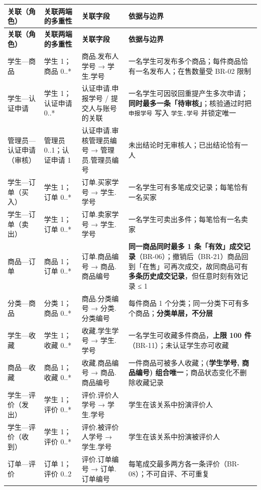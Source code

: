 \documentclass[12pt,a4paper]{ctexart}
\begin{document}
{\scriptsize
\begin{longtable}{|p{2.09cm}|p{2.15cm}|p{3.28cm}|p{8.48cm}|}
\hline
\textbf{关联（角色）} & \textbf{关联两端的多重性} & \textbf{关联字段} & \textbf{依据与边界} \\
\hline
\endfirsthead
\hline
\textbf{关联（角色）} & \textbf{关联两端的多重性} & \textbf{关联字段} & \textbf{依据与边界} \\
\hline
\endhead
\hline
\endfoot
学生—商品 & 学生 1；商品 0..* & 商品.发布人学号 → 学生.学号 & 一名学生可发布多个商品；每件商品恰有一名发布人；在售数量受 BR-02 限制 \\
\hline
学生—认证申请 & 学生 1；认证申请 0..* & 认证申请.申报学号 / 提交人与账号的关联 & 一名学生可因驳回重提产生多次申请；\textbf{同时最多一条「待审核」}；核验通过时把 \texttt{申报学号} 写入 \texttt{学生.学号} 并锁定唯一 \\
\hline
管理员—认证申请（审核） & 管理员 0..1；认证申请 1 & 认证申请.审核管理员编号 → 管理员.管理员编号 & 未出结论时无审核人；已出结论恰有一人 \\
\hline
学生—订单（买入） & 学生 1；订单 0..* & 订单.买家学号 → 学生.学号 & 一名学生可有多笔成交记录；每笔恰有一名买家 \\
\hline
学生—订单（卖出） & 学生 1；订单 0..* & 订单.卖家学号 → 学生.学号 & 一名学生可卖出多件；每笔恰有一名卖家 \\
\hline
商品—订单 & 商品 1；订单 0..* & 订单.商品编号 → 商品.商品编号 & \textbf{同一商品同时最多 1 条「有效」成交记录}（BR-06）；撤销后（BR-21）商品回到「在售」可再次成交，故同商品可有\textbf{多条历史成交记录}，但任意时刻有效记录 ≤ 1 \\
\hline
分类—商品 & 分类 1；商品 0..* & 商品.分类编号 → 分类.分类编号 & 每件商品 1 个分类；同一分类下可有多个商品；\textbf{分类单层，不分层} \\
\hline
学生—收藏 & 学生 1；收藏 0..* & 收藏.学生学号 → 学生.学号 & 一名学生可收藏多件商品，\textbf{上限 100 件}（BR-11）；未认证学生亦可收藏 \\
\hline
商品—收藏 & 商品 1；收藏 0..* & 收藏.商品编号 → 商品.商品编号 & 一件商品可被多人收藏；\textbf{(学生学号, 商品编号) 组合唯一}；商品状态变化不删除收藏记录 \\
\hline
学生—评价（发出） & 学生 1；评价 0..* & 评价.评价人学号 → 学生.学号 & 学生在该关系中扮演评价人 \\
\hline
学生—评价（收到） & 学生 1；评价 0..* & 评价.被评价人学号 → 学生.学号 & 学生在该关系中扮演被评价人 \\
\hline
订单—评价 & 订单 1；评价 0..2 & 评价.订单编号 → 订单.订单编号 & 每笔成交最多两方各一条评价（BR-08）；不可自评、不可重复 \\

\end{longtable}}
\end{document}

